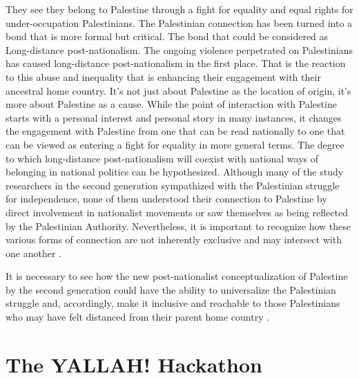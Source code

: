 They see they belong to Palestine through a fight for equality and equal rights for under-occupation Palestinians. The Palestinian connection has been turned into a bond that is more formal but critical. The bond that could be considered as Long-distance post-nationalism. The ongoing violence perpetrated on Palestinians has caused long-distance post-nationalism in the first place. That is the reaction to this abuse and inequality that is enhancing their engagement with their ancestral home country. It's not just about Palestine as the location of origin, it's more about Palestine as a cause. While the point of interaction with Palestine starts with a personal interest and personal story in many instances, it changes the engagement with Palestine from one that can be read nationally to one that can be viewed as entering a fight for equality in more general terms.
The degree to which long-distance post-nationalism will coexist with national ways of belonging in national politics can be hypothesized. Although many of the study researchers in the second generation sympathized with the Palestinian struggle for independence, none of them understood their connection to Palestine by direct involvement in nationalist movements or saw themselves as being reflected by the Palestinian Authority. Nevertheless, it is important to recognize how these various forms of connection are not inherently exclusive and may intersect with one another \citep{Blachnicka-Ciacek2018}.

It is necessary to see how the new post-nationalist conceptualization of Palestine by the second generation could have the ability to universalize the Palestinian struggle and, accordingly, make it inclusive and reachable to those Palestinians who may have felt distanced from their parent home country \citep{Blachnicka-Ciacek2018}. 

\section{The YALLAH! Hackathon}

